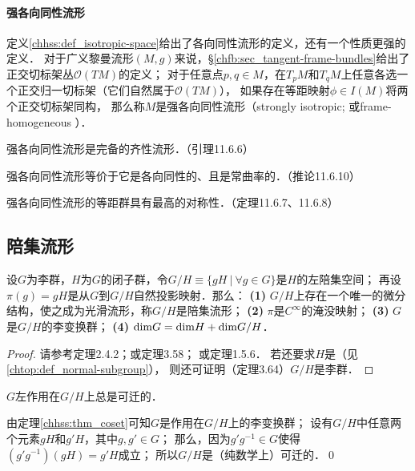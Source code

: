    

\paragraph{强各向同性流形}\label{chhss:sec_fh}
定义\ref{chhss:def_isotropic-space}给出了{\kaishu 各向同性流形}的定义，还有一个性质更强的定义．
对于广义黎曼流形$(M,g)$来说，\S\ref{chfb:sec_tangent-frame-bundles}给出了正交切标架丛$\mathcal{O}(TM)$的定义；
对于任意点$p,q\in M$，在$T_p M$和$T_q M$上任意各选一个正交归一切标架（它们自然属于$\mathcal{O}(TM)$），
如果存在等距映射$\phi\in I(M)$将两个正交切标架同构，
那么称$M$是{\heiti 强各向同性流形}（strongly isotropic; 或frame-homogeneous ）．

强各向同性流形是完备的齐性流形．（\parencite{wolf_SCC-2011}引理11.6.6）

强各向同性流形{\kaishu 等价于}它是各向同性的、且是常曲率的．（\parencite{wolf_SCC-2011}推论11.6.10）

强各向同性流形的等距群具有最高的对称性．（\parencite{wolf_SCC-2011}定理11.6.7、11.6.8）




\subsection{陪集流形}

\begin{theorem}\label{chhss:thm_coset}
    设$G$为李群，$H$为$G$的闭子群，令$G/H\equiv \{g H \ |\ \forall g\in G \}$是$H$的左陪集空间；
    再设$\pi(g)=g H$是从$G$到$G/H${\heiti 自然投影映射}．那么：    
    {\bfseries (1)} $G/H$上存在一个唯一的微分结构，使之成为光滑流形，称$G/H$是{\heiti 陪集流形}；    
    {\bfseries (2)} $\pi$是$C^\infty$的{\kaishu 淹没}映射；    
    {\bfseries (3)} $G$是$G/H$的李变换群；        
    {\bfseries (4)} ${\rm dim}G = {\rm dim}H + {\rm dim}G/H$．
\end{theorem}
\begin{proof}
    请参考\parencite{helgason-2001}定理2.4.2；或\parencite{warner-1983-FDMLG}定理3.58；
    或\parencite[\S 1.5]{wolf_SCC-2011}定理1.5.6．
    若还要求$H$是（见\ref{chtop:def_normal-subgroup}），
    则还可证明（\parencite{warner-1983-FDMLG}定理3.64）$G/H$是{\kaishu 李群}．
\end{proof}

\begin{example}\label{chhss:exm_ghtra}
    $G$左作用在$G/H$上总是可迁的．
\end{example}
由定理\ref{chhss:thm_coset}可知$G$是作用在$G/H$上的李变换群；
设有$G/H$中任意两个元素$gH$和$g' H$，其中$g,g'\in G$；
那么，因为$g' g^{-1} \in G$使得$(g' g^{-1}) (gH) = g' H$成立；
所以$G/H$是（纯数学上）可迁的．\qed

